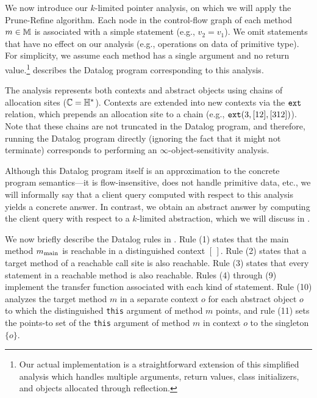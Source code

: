 
We now introduce our $k$-limited pointer analysis,
on which we will apply the Prune-Refine algorithm.
Each node in the control-flow graph of each method $m \in {\mathbb M}$ is associated with a
simple statement (e.g., $v_2 = v_1$).
We omit statements that have no effect on our analysis (e.g., operations on
data of primitive type).
For simplicity, we assume each method has a single argument and no return value.\footnote{
Our actual implementation is a straightforward extension of this simplified analysis
which handles multiple arguments, return values, class initializers, and
objects allocated through reflection.}
 describes the Datalog program corresponding to this
analysis.

The analysis represents both contexts and abstract objects using chains of
allocation sites (${\mathbb C} = {\mathbb H}^*$).  Contexts are extended into new contexts via the $\text{\tt ext}$ relation,
which prepends an allocation site to a chain (e.g., $\text{\tt ext}(3,[12],[312])$).
Note that these chains are not truncated in the Datalog program, and therefore,
running the Datalog program directly (ignoring the fact that it might not
terminate) corresponds to performing an $\infty$-object-sensitivity analysis.

Although this Datalog program itself is an approximation to the concrete
program semantics---it is flow-insensitive, does not handle primitive data,
etc., we will informally say that a client query computed with respect to this
analysis yields a concrete answer.  In contrast, we obtain an abstract
answer by computing the client query with respect to a $k$-limited abstraction,
which we will discuss in .

We now briefly describe the Datalog rules in .  Rule (1)
states that the main method $m_\text{main}$ is reachable in a distinguished context $[\,]$.
Rule (2) states that a target method of a reachable call site is also reachable.
Rule (3) states that every statement in a reachable method is also reachable.
Rules (4) through (9) implement the transfer function associated with each kind of statement.
Rule (10) analyzes the target method
$m$ in a separate context $o$ for each abstract object $o$ to which the distinguished
{\tt this} argument of method $m$ points, and rule (11) sets the points-to set
of the {\tt this} argument of method $m$ in context $o$ to the singleton $\{ o \}$.


